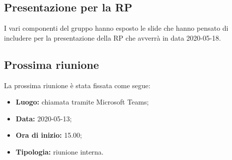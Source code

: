 	\subsection{Presentazione per la RP}
	I vari componenti del gruppo hanno esposto le slide che hanno pensato di includere per la presentazione della RP che avverrà in data 2020-05-18.
		
		
	\subsection{Prossima riunione}
		La prossima riunione è stata fissata come segue:
		\begin{itemize}
			\item \textbf{Luogo: } chiamata tramite Microsoft Teams; 
			\item \textbf{Data: } 2020-05-13;
			\item \textbf{Ora di inizio: } 15.00;
			\item \textbf{Tipologia: } riunione interna.
		\end{itemize}
